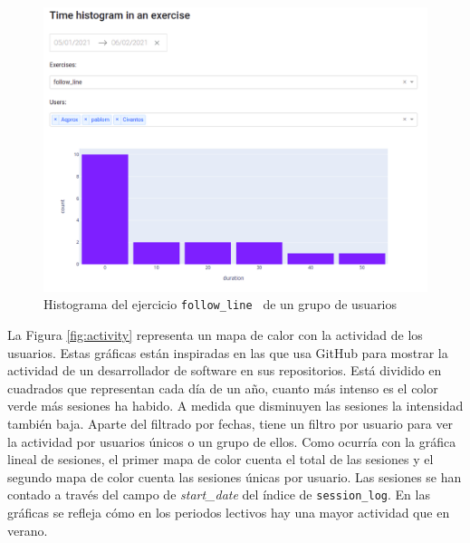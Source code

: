 \begin{figure}[H]
    \centering
    \includegraphics[width=17cm, keepaspectratio]{img/histogram_exercise.png}
    \caption{Histograma del ejercicio \texttt{follow\_line } de un grupo de usuarios }
    \label{fig:histogram_exercise}
\end{figure}

La Figura \ref{fig:activity} representa un mapa de calor con la actividad de los usuarios. Estas gráficas están inspiradas en las que usa GitHub para mostrar la actividad de un desarrollador de software en sus repositorios. Está dividido en cuadrados que representan cada día de un año, cuanto más intenso es el color verde más sesiones ha habido. A medida que disminuyen las sesiones la intensidad también baja. Aparte del filtrado por fechas, tiene un filtro por usuario para ver la actividad por usuarios únicos o un grupo de ellos. Como ocurría con la gráfica lineal de sesiones, el primer mapa de color cuenta el total de las sesiones y el segundo mapa de color cuenta las sesiones únicas por usuario. Las sesiones se han contado a través del campo de \textit{start\_date} del índice de \texttt{session\_log}. En las gráficas se refleja cómo en los periodos lectivos hay una mayor actividad que en verano.\\




